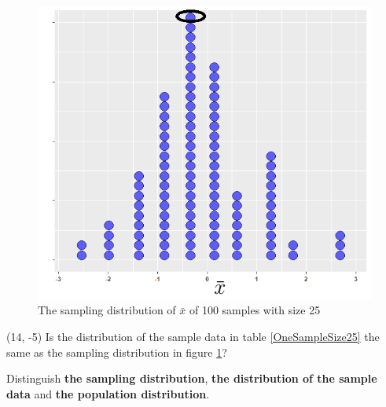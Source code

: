 \documentclass[a4paper, 12pt,twoside]{book}
\begin{document}
   \begin{figure}[H]
      \centering
      \includegraphics[scale=0.5]{100SamplesSize25FromN0_5}
      \caption{The sampling distribution of $\bar{x}$ of 100 samples with size 25}
      \label{100SamplesSize25FromN0_5}
   \end{figure}
   
   \begin{textblock}{4.2}(14, -5)
    \noindent Is the distribution of the sample data in table \ref{OneSampleSize25} the same as the sampling distribution in figure \ref{100SamplesSize25FromN0_5}?
   \end{textblock}
       \noindent \colorbox{babypink}{\parbox{\textwidth}{
     Distinguish \textbf{the sampling distribution}, \textbf{the distribution of the sample data} and \textbf{the population distribution}.
          }}\vspace{0.3cm}\\
     
\end{document}
